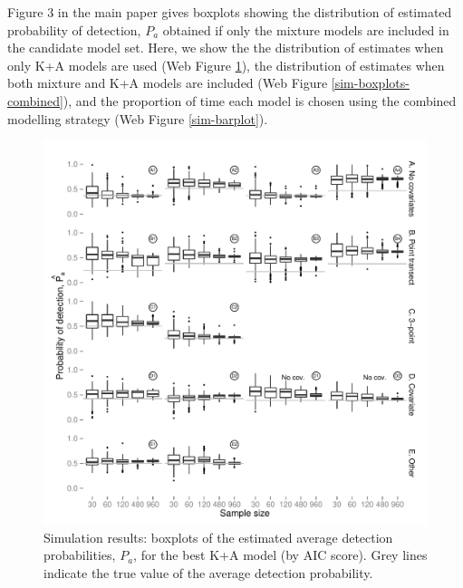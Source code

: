 \documentclass{report}
\begin{document}
Figure 3 in the main paper gives boxplots showing the distribution of estimated probability of detection, $P_a$ obtained if only the mixture models are included in the candidate model set.  Here, we show the the distribution of estimates when only K+A models are used (Web Figure \ref{sim-boxplots-cds}), the distribution of estimates when both mixture and K+A models are included (Web Figure \ref{sim-boxplots-combined}), and the proportion of time each model is chosen using the combined modelling strategy (Web Figure \ref{sim-barplot}).

\begin{figure}[H]
\centering
\includegraphics[width=\textwidth]{simulations/pa-plot-cds.pdf}
\caption{Simulation results: boxplots of the estimated average detection probabilities, $P_a$, for the best K+A model (by AIC score). Grey lines indicate the true value of the average detection probability.}
\label{sim-boxplots-cds}
\end{figure}
\end{document}
